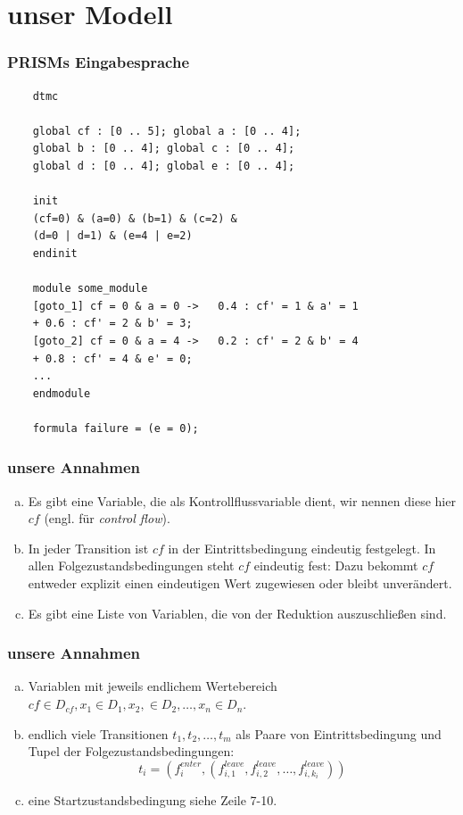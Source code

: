 \documentclass[onlymath]{beamer}
\begin{document}
\section{unser Modell}

\begin{frame}[fragile]
	\frametitle{PRISMs Eingabesprache}
  \lstset{basicstyle=\footnotesize}
	\begin{lstlisting}
	dtmc
	
	global cf : [0 .. 5]; global a : [0 .. 4];
	global b : [0 .. 4]; global c : [0 .. 4];
	global d : [0 .. 4]; global e : [0 .. 4];
	
	init
	(cf=0) & (a=0) & (b=1) & (c=2) &
	(d=0 | d=1) & (e=4 | e=2)
	endinit
	
	module some_module
	[goto_1] cf = 0 & a = 0 ->   0.4 : cf' = 1 & a' = 1
	+ 0.6 : cf' = 2 & b' = 3;
	[goto_2] cf = 0 & a = 4 ->   0.2 : cf' = 2 & b' = 4
	+ 0.8 : cf' = 4 & e' = 0;
	...
	endmodule
	
	formula failure = (e = 0);
	\end{lstlisting}
\end{frame}


\begin{frame}
	\frametitle{unsere Annahmen}	
\begin{enumerate}[(a)]
	\item Es gibt eine Variable, die als Kontrollflussvariable dient, wir nennen diese hier $cf$ (engl. für \textit{control flow}). \pause
	\item In jeder Transition ist $cf$ in der Eintrittsbedingung eindeutig festgelegt. In allen Folgezustandsbedingungen steht $cf$ eindeutig fest: Dazu bekommt $cf$ entweder explizit einen eindeutigen Wert zugewiesen oder bleibt unverändert. \pause
	\item Es gibt eine Liste von Variablen, die von der Reduktion auszuschließen sind.
\end{enumerate}

\end{frame}


\begin{frame}
	\frametitle{unsere Annahmen}	
	\begin{enumerate}[(d)]
		\item Variablen mit jeweils endlichem Wertebereich $cf \in D_{cf}, x_1 \in D_{1}, x_2, \in D_2, \dots, x_n \in D_n$. \pause
		\item endlich viele Transitionen $t_1, t_2, \dots , t_m$ als Paare von Eintrittsbedingung und Tupel der Folgezustandsbedingungen:
		\[t_i = (f^{enter}_i, (f^{leave}_{i,1}, f^{leave}_{i,2}, \dots , f^{leave}_{i,k_i}))\] \pause
		\item eine Startzustandsbedingung siehe Zeile 7-10.
	\end{enumerate}	
\end{frame}
\end{document}
